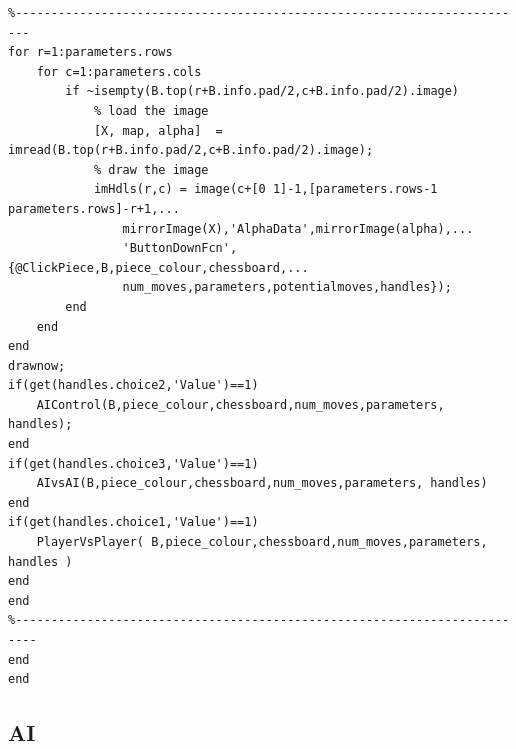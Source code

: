 \documentclass[11pt,a4paper]{article}
\begin{document}
\begin{lstlisting}
%------------------------------------------------------------------------
for r=1:parameters.rows
    for c=1:parameters.cols
        if ~isempty(B.top(r+B.info.pad/2,c+B.info.pad/2).image)
            % load the image
            [X, map, alpha]  = imread(B.top(r+B.info.pad/2,c+B.info.pad/2).image);
            % draw the image
            imHdls(r,c) = image(c+[0 1]-1,[parameters.rows-1 parameters.rows]-r+1,...
                mirrorImage(X),'AlphaData',mirrorImage(alpha),...
                'ButtonDownFcn',{@ClickPiece,B,piece_colour,chessboard,...
                num_moves,parameters,potentialmoves,handles});
        end
    end
end
drawnow;
if(get(handles.choice2,'Value')==1)
    AIControl(B,piece_colour,chessboard,num_moves,parameters, handles);
end
if(get(handles.choice3,'Value')==1)
    AIvsAI(B,piece_colour,chessboard,num_moves,parameters, handles)
end
if(get(handles.choice1,'Value')==1)
    PlayerVsPlayer( B,piece_colour,chessboard,num_moves,parameters, handles )
end
end
%-------------------------------------------------------------------------
end
end
\end{lstlisting}

\subsection{AI}
\end{document}
